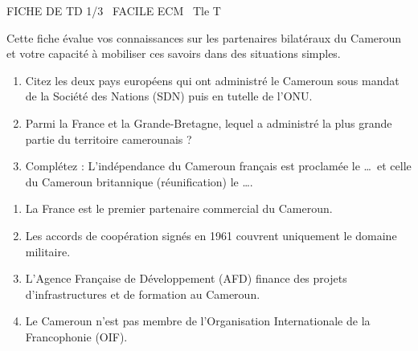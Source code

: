 \documentclass[11pt]{article}
\begin{document}
\begin{tcolorbox}[enhanced,colback=popink,colframe=popink,arc=10pt,boxrule=0pt,left=12pt,right=12pt,top=9pt,bottom=9pt]
{\color{white}\popxbold\small FICHE DE TD 1/3 \textbullet\ FACILE \hfill ECM \textbullet\ Tle T\par}
\end{tcolorbox}
\vspace{4pt}
Cette fiche évalue vos connaissances sur les partenaires bilatéraux du Cameroun et votre capacité à mobiliser ces savoirs dans des situations simples.

\begin{exercice}
\begin{enumerate}
    \item Citez les deux pays européens qui ont administré le Cameroun sous mandat de la Société des Nations (SDN) puis en tutelle de l'ONU.
    \item Parmi la France et la Grande-Bretagne, lequel a administré la plus grande partie du territoire camerounais ?
    \item Complétez : L'indépendance du Cameroun français est proclamée le \ldots\ et celle du Cameroun britannique (réunification) le \ldots.
\end{enumerate}
\end{exercice}

\begin{exercice}
\begin{enumerate}
    \item La France est le premier partenaire commercial du Cameroun.
    \item Les accords de coopération signés en 1961 couvrent uniquement le domaine militaire.
    \item L'Agence Française de Développement (AFD) finance des projets d'infrastructures et de formation au Cameroun.
    \item Le Cameroun n'est pas membre de l'Organisation Internationale de la Francophonie (OIF).
\end{enumerate}
\end{exercice}
\end{document}
